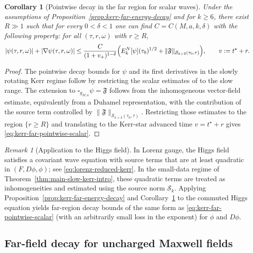 \documentclass[11pt]{article}
\numberwithin{equation}{section}
\theoremstyle{plain}
\newtheorem{corollary}[theorem]{Corollary}
\theoremstyle{definition}
\theoremstyle{remark}
\newtheorem{remark}{Remark}[section]
\begin{document}
\begin{corollary}[Pointwise decay in the far region for scalar waves]\label{cor:kerr-far-pointwise-scalar}
Under the assumptions of Proposition~\ref{prop:kerr-far-energy-decay} and for $k\ge 6$, there exist $R\gg1$ such that for every $0<\delta<1$ one can find $C=C(M,a,k,\delta)$ with the following property: for all $(\tau,r,\omega)$ with $r\ge R$,
\begin{equation}\label{eq:kerr-far-pointwise-scalar}
|\psi(\tau,r,\omega)|
+
|\nabla\psi(\tau,r,\omega)|
\le
\frac{C}{(1+v_{+})^{1-\delta}}
\Bigl(
E^{N}_{k}[\psi](\tau_{0})^{1/2}
+
\|\mathfrak{F}\|_{\mathcal S_{k+2}(\tau_{0},\tau)}
\Bigr),
\qquad
v:=t^{\star}+r.
\end{equation}
\end{corollary}

\begin{proof}
The pointwise decay bounds for $\psi$ and its first derivatives in the slowly rotating Kerr regime follow by restricting the scalar estimates of \cite[Corollary~3.1]{DRSRKerrIII} to the slow range.
The extension to $\square_{g_{M,a}}\psi=\mathfrak{F}$ follows from the inhomogeneous vector-field estimate, equivalently from a Duhamel representation, with the contribution of the source term controlled by $\|\mathfrak{F}\|_{\mathcal S_{k+2}(\tau_{0},\tau)}$.
Restricting those estimates to the region $\{r\ge R\}$ and translating to the Kerr-star advanced time $v=t^{\star}+r$ gives \eqref{eq:kerr-far-pointwise-scalar}.
\end{proof}


\begin{remark}[Application to the Higgs field]\label{rem:kerr-far-higgs}
In Lorenz gauge, the Higgs field satisfies a covariant wave equation with source terms that are at least quadratic in $(F,D\phi,\phi)$; see \eqref{eq:lorenz-reduced-kerr}.
In the small-data regime of Theorem~\ref{thm:main-slow-kerr-intro}, these quadratic terms are treated as inhomogeneities and estimated using the source norm $\mathcal S_{k}$.
Applying Proposition~\ref{prop:kerr-far-energy-decay} and Corollary~\ref{cor:kerr-far-pointwise-scalar} to the commuted Higgs equation yields far-region decay bounds of the same form as \eqref{eq:kerr-far-pointwise-scalar} (with an arbitrarily small loss in the exponent) for $\phi$ and $D\phi$.
\end{remark}

\subsection{Far-field decay for uncharged Maxwell fields}\label{subsec:kerr-far-maxwell}
\end{document}
